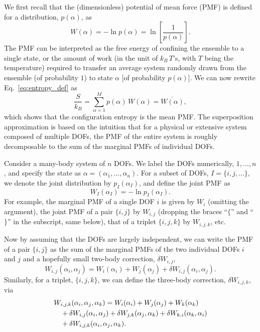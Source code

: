 \documentclass[reprint, superscriptaddress]{revtex4-1}
\begin{document}
We first recall that the (dimensionless) potential of mean force (PMF)
is defined for a distribution, $p(\alpha)$,
as
$$
W(\alpha) = -\ln p(\alpha) = \ln\left[ \frac{1}{p(\alpha)} \right].
$$
The PMF can be interpreted as
the free energy of confining the ensemble to a single state,
or the amount of work
(in the unit of $k_B \, T$'s, with $T$ being the temperature)
required to transfer an average system randomly drawn from the ensemble (of probability $1$)
to state $\alpha$ [of probability $p(\alpha)$].
%
We can now rewrite Eq.~\eqref{eq:entropy_def} as
%
\begin{equation}
  \frac{S}{k_B}
  =
  \sum_{\alpha = 1}^M p(\alpha) \, W(\alpha)
  =
  \overline{ W(\alpha) }
  ,
  \label{eq:S_W}
\end{equation}
%
which shows that the configuration entropy
is the mean PMF.
%
The superposition approximation is based on the intuition
that for a physical or extensive system composed of multiple DOFs,
the PMF of the entire system is roughly decomposable to
the sum of the marginal PMFs of individual DOFs.

Consider a many-body system of $n$ DOFs.
%
We label the DOFs numerically, $1, \dots, n$,
and specify the state as $\alpha = (\alpha_1, \dots, \alpha_n)$.
%
%
For a subset of DOFs, $I = \{i, j, \dots\}$,
we denote the joint distribution by $p_I(\alpha_I)$,
and define the joint PMF as
%
\begin{equation}
  W_I(\alpha_I) = -\ln p_I(\alpha_I)
  .
  \label{eq:WI_def}
\end{equation}
%
For example,
the marginal PMF of a single DOF $i$ is given by $W_i$ (omitting the argument),
the joint PMF of a pair $\{i, j\}$ by $W_{i, j}$
(dropping the braces ``$\{$'' and ``$\}$'' in the subscript, same below),
that of a triplet $\{i, j, k\}$ by $W_{i, j, k}$, etc.

Now by assuming that the DOFs are largely independent,
we can write the PMF of a pair $\{i, j\}$
as the sum of the marginal PMFs of the two individual DOFs $i$ and $j$
and a hopefully small two-body correction, $\delta W_{i,j}$,
%
\begin{equation}
  W_{i,j}(\alpha_i, \alpha_j)
  =
  W_i(\alpha_i) + W_j(\alpha_j)
  + \delta W_{i,j}(\alpha_i, \alpha_j)
  .
  \label{eq:W_ij}
\end{equation}
%
Similarly, for a triplet, $\{i, j, k\}$,
we can define the three-body correction, $\delta W_{i,j,k}$, via
%
\begin{align}
  &W_{i,j,k}(\alpha_i, \alpha_j, \alpha_k)
  =
  W_i(\alpha_i) + W_j(\alpha_j) + W_k(\alpha_k)
  \notag \\
  &\quad
  + \delta W_{i,j}(\alpha_i, \alpha_j)
  + \delta W_{j,k}(\alpha_j, \alpha_k)
  + \delta W_{k,i}(\alpha_k, \alpha_i)
  \notag \\
  &\quad
  + \delta W_{i,j,k}(\alpha_i, \alpha_j, \alpha_k)
  .
  \label{eq:W_ijk}
\end{align}
%
\end{document}
